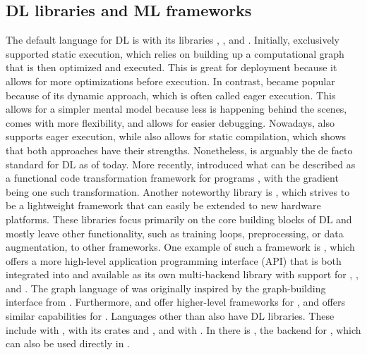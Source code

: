 \documentclass[article,shortnames]{jss}
\theoremstyle{definition}
\begin{document}
\subsection{DL libraries and ML frameworks}\label{sec:dl-libraries}

The default language for DL is \python{} \citep{ref-van1995python} with its libraries \tensorflow{} \citep{ref-abadi2016tensorflow}, \pytorch{} \citep{ref-pytorch}, and  \citep{ref-jax2018github}.
Initially, \tensorflow{} exclusively supported static execution, which relies on building up a computational graph that is then optimized and executed. This is great for deployment because it allows for more optimizations before execution. In contrast, \pytorch{} became popular because of its dynamic approach, which is often called eager execution. This allows for a simpler mental model because less is happening behind the scenes, comes with more flexibility, and allows for easier debugging.
Nowadays, \tensorflow{} also supports eager execution, while \pytorch{} also allows for static compilation, which shows that both approaches have their strengths.
Nonetheless, \pytorch{} is arguably the de facto standard for DL as of today.
More recently,  introduced what can be described as a functional code transformation framework for  programs \citep{ref-harris2020array}, with the gradient being one such transformation.
Another noteworthy \python{} library is  \citep{ref-tinygrad}, which strives to be a lightweight framework that can easily be extended to new hardware platforms.
These libraries focus primarily on the core building blocks of DL and mostly leave other functionality, such as training loops, preprocessing, or data augmentation, to other frameworks.
One example of such a framework is  \citep{ref-chollet2018keras}, which offers a more high-level application programming interface (API) that is both integrated into \tensorflow{} and available as its own multi-backend library with support for \pytorch{}, \tensorflow{}, and .
The graph language of \mlrttorch{} was originally inspired by the graph-building interface from .
Furthermore,  \citep{ref-lightning2019} and  \citep{howard2020fastai} offer higher-level frameworks for \pytorch{}, and  \citep{ref-flax} offers similar capabilities for .
Languages other than \python{} also have DL libraries.
These include \julia{} \citep{ref-bezanson2017julia} with \flux{} \citep{ref-innes2018flux}, \rust{} \citep{ref-matsakis2014rust} with its crates  \citep{ref-burn} and  \citep{ref-candle}, and  \citep{ref-go} with  \citep{ref-gomlx}.
In \cpp{} there is , the \cpp{} backend for \pytorch{}, which can also be used directly in \cpp{}.
\end{document}
